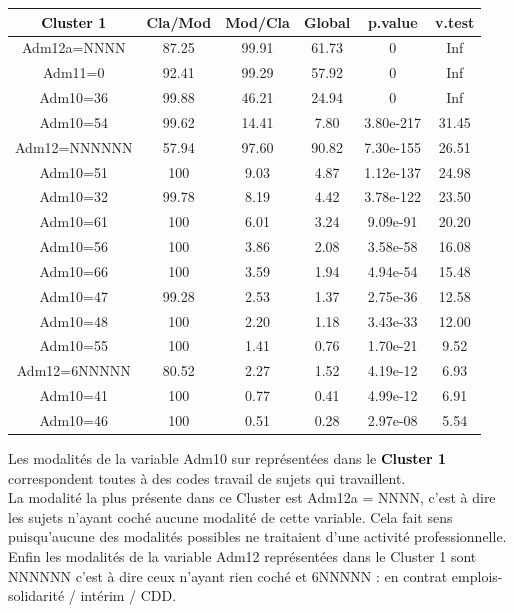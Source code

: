 \documentclass{book}
\begin{document}
\setlength\arrayrulewidth{2pt}
\begin{tabular}{|c||ccccc|}
\hline
  \textbf{\textcolor{black}{Cluster 1}}       &    Cla/Mod  &   Mod/Cla   &   Global   &    p.value  &   v.test  \\
\hline
\hline 
            
Adm12a=NNNN  & 87.25 &99.91 &61.73  &0 &       Inf\\
Adm11=0      & 92.41 &99.29 &57.92  &0 &       Inf\\
Adm10=36     & 99.88 &46.21 &24.94  &0 &      Inf\\
Adm10=54     & 99.62 &14.41 & 7.80 &3.80e-217  &31.45\\
Adm12=NNNNNN & 57.94 &97.60 &90.82 &7.30e-155 & 26.51\\
Adm10=51     & 100 & 9.03 & 4.87 &1.12e-137  &24.98\\
Adm10=32     & 99.78 & 8.19 & 4.42 &3.78e-122  &23.50\\
Adm10=61     & 100 & 6.01 & 3.24 & 9.09e-91 & 20.20\\
Adm10=56     & 100 & 3.86 & 2.08 & 3.58e-58 & 16.08\\
Adm10=66     & 100 & 3.59 & 1.94 & 4.94e-54 & 15.48\\
Adm10=47     & 99.28 & 2.53 & 1.37 & 2.75e-36 & 12.58\\
Adm10=48    & 100 & 2.20 & 1.18 & 3.43e-33 & 12.00\\
Adm10=55    & 100& 1.41 & 0.76 & 1.70e-21 &  9.52\\
Adm12=6NNNNN & 80.52 & 2.27 & 1.52 & 4.19e-12  & 6.93\\
Adm10=41    & 100 & 0.77 & 0.41 & 4.99e-12 &  6.91\\
Adm10=46    & 100 &0.51 & 0.28 & 2.97e-08 &  5.54\\
\hline
\end{tabular}

\noindent
Les modalités de la variable Adm10 sur représentées dans le \textbf{\textcolor{black}{Cluster 1}} correspondent toutes à des codes travail de sujets qui travaillent. \\
La modalité la plus présente dans ce Cluster est Adm12a = NNNN, c'est à dire les sujets n'ayant coché aucune modalité de cette variable. Cela fait sens puisqu'aucune des modalités possibles ne traitaient d'une activité professionnelle. \\
Enfin les modalités de la variable Adm12 représentées dans le Cluster 1 sont NNNNNN c'est à dire ceux n'ayant rien coché et 6NNNNN : en contrat emplois-solidarité / intérim / CDD.\\
\end{document}
